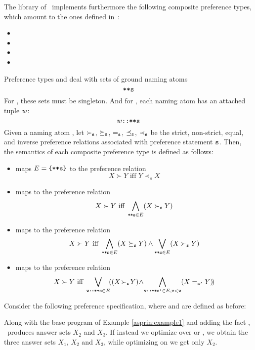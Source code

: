 The library of \asprin\ implements furthermore the following composite preference types,
which amount to the ones defined in~\cite{sonpon06a}: 
\begin{itemize}
\item {}
\item {}
\item {}
\item {}
\end{itemize}
Preference types  and  deal with sets of ground naming atoms
\[\texttt{**s}\]
For , these sets must be singleton.
And for , each naming atom has an attached tuple $\texttt{$w$}$: 
\[w\texttt{::**s}\]
Given a naming atom , 
let $\succ_{\texttt{s}}$, $\succeq_{\texttt{s}}$, $=_{\texttt{s}}$, $\preceq_{\texttt{s}}$, $\prec_{\texttt{s}}$ be the 
strict, non-strict, equal, and inverse preference relations associated with preference statement $\texttt{s}$.
Then, the semantics of each composite preference type is defined as follows:
\begin{itemize}
\item
{} maps $E=\texttt{\{**s\}}$ to the preference relation
\[
X \succ Y \text{ iff } Y \prec_s X
\]
\item 
{} maps  to the preference relation 
\[
X \succ Y \text{ iff } \bigwedge_{\texttt{**s}\in E}(X\succ_{\texttt{s}} Y)
\]
\item 
{} maps  to the preference relation 
\[
X \succ Y \text{ iff } \bigwedge_{\texttt{**s}\in E} (X\succeq_{\texttt{s}} Y)\wedge\bigvee_{\texttt{**s}\in E} (X\succ_{\texttt{s}} Y)
\]
\item
{} maps  to the preference relation 
\[
X \succ Y \text{ iff } \bigvee_{\texttt{w::**s}\in E}\!((X\!\succ_{\texttt{s}} \!Y)\!\wedge\!\bigwedge_{\texttt{v::**s'}\in E,\texttt{v}<\texttt{w}}(X =_{\texttt{s'}} Y)\!)
\] 
\end{itemize}

\begin{example}\label{asprin:composite}
Consider the following preference specification, where  and  are defined as before:
%

%
Along with the base program of Example \ref{asprin:example1} and adding the fact , 
\asprin\ produces answer sets $X_2$ and $X_3$. 
If instead we optimize over \code{p7} or \code{p8}, we obtain the three answer sets $X_1$, $X_2$ and $X_3$, 
while optimizing on \code{p9} we get only $X_2$.
\end{example}

